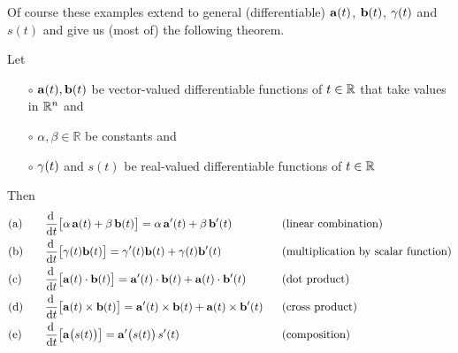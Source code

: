 Of course these examples extend to general (differentiable)
$\mathbf{a}(t)$, $\mathbf{b}(t)$, $\gamma(t)$ and $s(t)$ and give us (most of) the following theorem.

\begin{theorem}\label{thm:DIFFalgebra}
Let 
\begin{itemize}\itemsep1pt \parskip0pt  %
\item[$\circ$]
$\mathbf{a}(t),\mathbf{b}(t)$ be vector-valued differentiable functions of $t\in\mathbb{R}$
that take values in $\mathbb{R}^n$ and
\item[$\circ$]
 $\alpha,\beta \in \mathbb{R}$ be constants and 
\item[$\circ$]
 $\gamma(t)$ and $s(t)$ be real-valued differentiable functions of $t\in\mathbb{R}$
\end{itemize}
Then
\begin{alignat*}{5}
&\text{(a)}\quad &&\diff{}{t}\big[\alpha\,\va(t)+\beta\,\vb(t)\big]
         =\alpha\,\va'(t)+\beta\,\vb'(t)
           &&\text{(linear combination)}
\\
&\text{(b)} &&\diff{}{t}\big[\ga(t)\vb(t)\big]
         =\ga'(t)\vb(t)+\ga(t)\vb'(t)
           &&\text{(multiplication by scalar function)}
\\
&\text{(c)} &&\diff{}{t}\big[\va(t)\cdot\vb(t)\big]
         =\va'(t)\cdot\vb(t)+\va(t)\cdot\vb'(t)
           &&\text{(dot product)}
\\
&\text{(d)} &&\diff{}{t}\big[\va(t)\times\vb(t)\big]
         =\va'(t)\times\vb(t)+\va(t)\times\vb'(t)
           \ \ &&\text{(cross product)}
\\
&\text{(e)} &&\diff{}{t}\big[\va\big(s(t)\big)\big]
         =\va'\big(s(t)\big)\,s'(t)
           &&\text{(composition)}
\end{alignat*}
\end{theorem}

